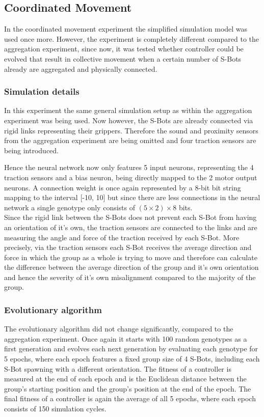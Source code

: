 %
%

\subsection{Coordinated Movement}
In the coordinated movement experiment the simplified simulation model was
used once more. However, the experiment is completely different compared to the
aggregation experiment, since now, it was tested whether controller could
be evolved that result in collective movement when a certain number of S-Bots
already are aggregated and physically connected.

\subsubsection{Simulation details}
In this experiment the same general simulation setup as within the aggregation
experiment was being used. Now however, the S-Bots are already connected via
rigid links representing their grippers. Therefore the sound and proximity
sensors from the aggregation experiment are being omitted and four
traction sensors are being introduced.

Hence the neural network now only features 5 input neurons, representing the
4 traction sensors and a bias neuron, being directly mapped to the 2 motor
output neurons. A connection weight is once again represented by a 8-bit
bit string mapping to the interval [-10, 10] but since there are less
connections in the neural network a single genotype only consists of $(5\times 2) \times 8$ bits.
\ \\

Since the rigid link between the S-Bots
does not prevent each S-Bot from having an orientation of it's own, the
traction sensors are connected to the links and are measuring the angle and
force of the traction received by each S-Bot. More precisely, via the
traction sensors each S-Bot receives the average direction and force in which
the group as a whole is trying to move and therefore can calculate the
difference between the average direction of the group and it's own orientation
and hence the severity of it's own misalignment compared to the majority of
the group.

\subsubsection{Evolutionary algorithm}
The evolutionary algorithm did not change significantly, compared to the
aggregation experiment. Once again it starts with 100 random genotypes as
a first generation and evolves each next generation by evaluating each
genotype for 5 epochs, where each epoch features a fixed group size of 4
S-Bots, including each S-Bot spawning with a different orientation. The
fitness of a controller is measured at the end of each epoch and is the
Euclidean distance between the group's starting position and the group's
position at the end of the epoch. The final fitness of a controller is again
the average of all 5 epochs, where each epoch consists of 150 simulation
cycles.
\ \\

